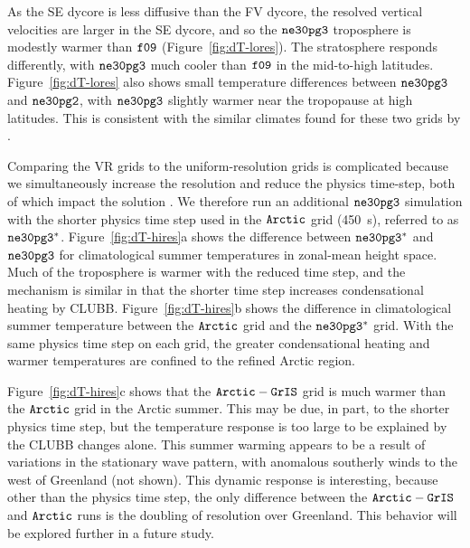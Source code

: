 \documentclass[draft]{agujournal2019}
\begin{document}
As the SE dycore is less diffusive than the FV dycore, the resolved vertical velocities are larger in the SE dycore, and so the $\tt ne30pg3$ troposphere is modestly warmer than $\tt f09$ (Figure~\ref{fig:dT-lores}). The stratosphere responds differently, with $\tt ne30pg3$ much cooler than $\tt f09$ in the mid-to-high latitudes. Figure~\ref{fig:dT-lores} also shows small temperature differences between $\tt ne30pg3$ and $\tt ne30pg2$, with  $\tt ne30pg3$ slightly warmer near the tropopause at high latitudes. This is consistent with the similar climates found for these two grids by .

Comparing the VR grids to the uniform-resolution grids is complicated because we simultaneously increase the resolution and reduce the physics time-step, both of which impact the solution \cite{W2008TELLUS}. We therefore run an additional $\tt ne30pg3$ simulation with the shorter physics time step used in the $\tt Arctic$ grid (450~s), referred to as $\tt ne30pg3^{*}$. Figure~\ref{fig:dT-hires}a shows the difference between $\tt ne30pg3^{*}$ and $\tt ne30pg3$ for climatological summer temperatures in zonal-mean height space. Much of the troposphere is warmer with the reduced time step, and the mechanism is similar in that the shorter time step increases condensational heating by CLUBB. Figure~\ref{fig:dT-hires}b shows the difference in climatological summer temperature between the $\tt Arctic$ grid and the $\tt ne30pg3^{*}$ grid.  With the same physics time step on each grid, the greater condensational heating and warmer temperatures are confined to the refined Arctic region.

Figure~\ref{fig:dT-hires}c shows that the $\tt Arctic-GrIS$ grid is much warmer than the $\tt Arctic$ grid in the Arctic summer. This may be due, in part, to the shorter physics time step,
but the temperature response is too large to be explained by the CLUBB changes alone. This summer warming appears to be a result of variations in the stationary wave pattern, with anomalous southerly winds to the west of Greenland (not shown). This dynamic response is interesting, because other than the physics time step, the only difference between the $\tt Arctic-GrIS$ and $\tt Arctic$ runs is the doubling of resolution over Greenland. This behavior will be explored further in a future study.
\end{document}
